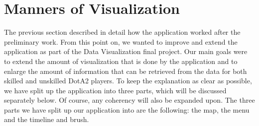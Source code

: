 \documentclass[11pt,twoside,a4paper]{article}
\begin{document}
\section{Manners of Visualization}
\label{sec:mov}
The previous section described in detail how the application worked after the preliminary work. From this point on, we wanted to improve and extend the application as part of the Data Visualization final project. Our main goals were to extend the amount of visualization that is done by the application and to enlarge the amount of information that can be retrieved from the data for both skilled and unskilled DotA2 players. 
\newline
To keep the explanation as clear as possible, we have split up the application into three parts, which will be discussed separately below. Of course, any coherency will also be expanded upon. The three parts we have split up our application into are the following: the map, the menu and the timeline and brush.
\end{document}
